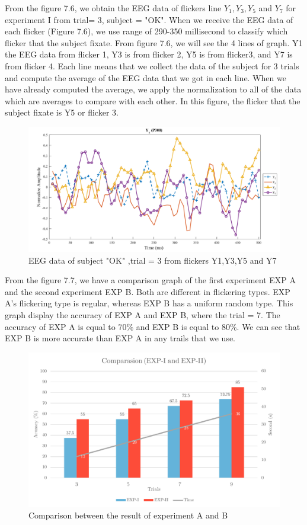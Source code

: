 From the figure 7.6, we obtain the EEG data of flickers line $Y_1,Y_3,Y_5$ and $Y_7$ for experiment I from trial= 3, subject = "OK". When we receive the EEG data of each flicker (Figure 7.6), we use range of 290-350 millisecond to classify which flicker that the subject fixate. From figure 7.6, we will see the 4 lines of graph. Y1 the EEG data from flicker 1, Y3 is from flicker 2, Y5 is from flicker3, and Y7 is from flicker 4. Each line means that we collect the data of the subject for 3 trials and compute the average of the EEG data that we got in each line. When we have already computed the average, we apply the normalization to all of the data which are averages to compare with each other. In this figure, the flicker that the subject fixate is Y5 or flicker 3.

\begin{figure}[ht]
	\centering
	\includegraphics[width=\textwidth]{chapter7/erp_result.pdf}
	\caption{EEG data of subject "OK" ,trial = 3 from flickers Y1,Y3,Y5 and Y7}
\end{figure}

From the figure 7.7, we have a comparison graph of the first experiment EXP A and the second experiment EXP B. Both are different in flickering types. EXP A's flickering type is regular, whereas EXP B has a uniform random type. This graph display the accuracy of EXP A and EXP B, where the trial = 7. The accuracy of EXP A is equal to 70\% and EXP B is equal to 80\%. We can see that EXP B is more accurate than EXP A in any trails that we use.

\begin{figure}[ht]
	\centering
	\includegraphics[width=\textwidth]{chapter7/result_12_2.pdf}
	\caption{Comparison between the result of experiment A and B}
\end{figure}

